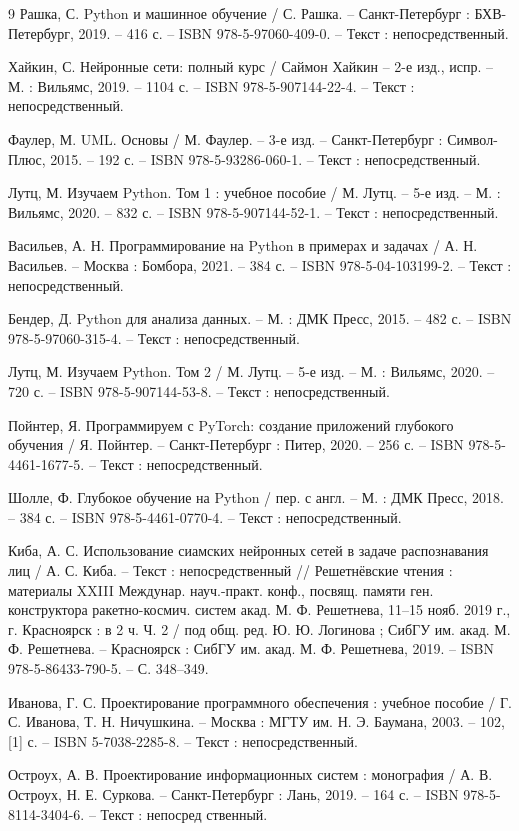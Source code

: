 \begin{thebibliography}{9}
     Рашка, С. Python и машинное обучение / С. Рашка. – Санкт-Петербург : БХВ-Петербург, 2019. – 416 с. – ISBN 978-5-97060-409-0. – Текст : непосредственный.
    
     Хайкин, С. Нейронные сети: полный курс / Саймон Хайкин – 2-е изд., испр. – М. : Вильямс, 2019. – 1104 с. – ISBN 978-5-907144-22-4. – Текст : непосредственный.
     
     Фаулер, М. UML. Основы / М. Фаулер. – 3-е изд. – Санкт-Петербург : Символ-Плюс, 2015. – 192 с. – ISBN 978-5-93286-060-1. – Текст : непосредственный.
     
     Лутц, М. Изучаем Python. Том 1 : учебное пособие / М. Лутц. – 5-е изд. – М. : Вильямс, 2020. – 832 с. – ISBN 978-5-907144-52-1. – Текст : непосредственный.
    
     Васильев, А. Н. Программирование на Python в примерах и задачах / А. Н. Васильев. – Москва : Бомбора, 2021. – 384 с. – ISBN 978-5-04-103199-2. – Текст : непосредственный.
    
     Бендер, Д. Python для анализа данных. – М. : ДМК Пресс, 2015. – 482 с. – ISBN 978-5-97060-315-4. – Текст : непосредственный.
    
     Лутц, М. Изучаем Python. Том 2 / М. Лутц. – 5-е изд. – М. : Вильямс, 2020. – 720 с. – ISBN 978-5-907144-53-8. – Текст : непосредственный.
     
     Пойнтер, Я. Программируем с PyTorch: создание приложений глубокого обучения / Я. Пойнтер. – Санкт-Петербург : Питер, 2020. – 256 с. – ISBN 978-5-4461-1677-5. – Текст : непосредственный.
    
     Шолле, Ф. Глубокое обучение на Python / пер. с англ. – М. : ДМК Пресс, 2018. – 384 с. – ISBN 978-5-4461-0770-4. – Текст : непосредственный.
    
     Киба, А. С. Использование сиамских нейронных сетей в задаче распознавания лиц / А. С. Киба. – Текст : непосредственный // Решетнёвские чтения : материалы XXIII Междунар. науч.-практ. конф., посвящ. памяти ген. конструктора ракетно-космич. систем акад. М. Ф. Решетнева, 11–15 нояб. 2019 г., г. Красноярск : в 2 ч. Ч. 2 / под общ. ред. Ю. Ю. Логинова ; СибГУ им. акад. М. Ф. Решетнева. – Красноярск : СибГУ им. акад. М. Ф. Решетнева, 2019. – ISBN 978-5-86433-790-5. – С. 348–349.
    
     Иванова, Г. С. Проектирование программного обеспечения : учебное пособие / Г. С. Иванова, Т. Н. Ничушкина. – Москва : МГТУ им. Н. Э. Баумана, 2003. – 102,[1] с. – ISBN 5-7038-2285-8. – Текст : непосредственный. 
    
     Остроух, А. В. Проектирование информационных систем : 
    монография / А. В. Остроух, Н. Е. Суркова. – Санкт-Петербург : 
    Лань, 2019. – 164 с. – ISBN 978-5-8114-3404-6. – Текст : непосред
    ственный.
    
     
     
\end{thebibliography}
